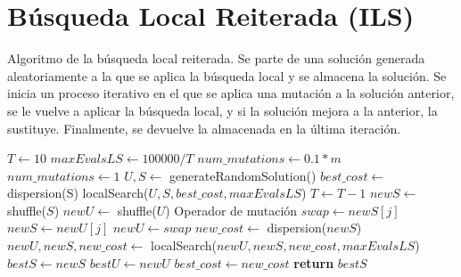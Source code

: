 \section{Búsqueda Local Reiterada (ILS)}
\begin{algorithm}[H]
\caption{Algoritmo de la búsqueda local reiterada. Se parte de una solución generada aleatoriamente a la que se aplica la búsqueda local y se almacena la solución. Se inicia un proceso iterativo en el que se aplica una mutación a la solución anterior, se le vuelve a aplicar la búsqueda local, y si la solución mejora a la anterior, la sustituye. Finalmente, se devuelve la almacenada en la última iteración.}
\begin{algorithmic}[1]
    \State $T \leftarrow 10$
    \State $maxEvalsLS \leftarrow 100000/T$
    \State $num\_mutations \leftarrow 0.1*m$
        \State $num\_mutations \leftarrow 1$
    \EndIf
    \State
    \State $U, S \leftarrow$ generateRandomSolution()
    \State
    \State $best\_cost \leftarrow$ dispersion(S)
    \State localSearch($U, S, best\_cost, maxEvalsLS$)
    \State $T \leftarrow T - 1$
    \State
        \State $newS \leftarrow$ shuffle($S$)
        \State $newU \leftarrow$ shuffle($U$)
        \State
         \Comment Operador de mutación
            \State $swap \leftarrow newS[j]$
            \State $newS \leftarrow newU[j]$
            \State $newU \leftarrow swap$
        \EndFor
        \State 
        \State $new\_cost \leftarrow$ dispersion($newS$)
        \State $newU, newS, new\_cost \leftarrow$ localSearch($newU, newS, new\_cost, maxEvalsLS$)
        \State
            \State $bestS \leftarrow newS$
            \State $bestU \leftarrow newU$
            \State $best\_cost \leftarrow new\_cost$
        \EndIf
    \EndFor
    \State
    \State \textbf{return} $bestS$  
\EndProcedure
\end{algorithmic}
\end{algorithm}

\newpage
